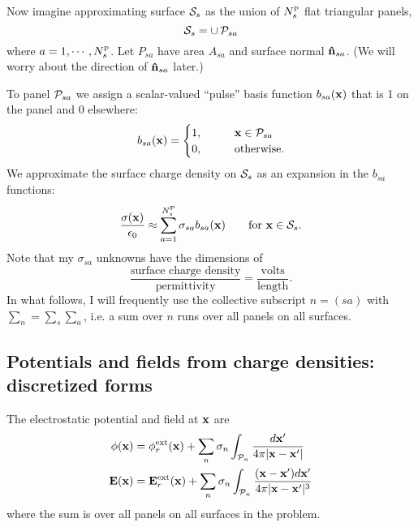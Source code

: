 \documentclass[letterpaper]{article}
\begin{document}
Now imagine approximating surface $\mathcal{S}_s$ as the union
of $N_s^{\hbox{\tiny{P}}}$ flat triangular panels, 
$$ \mathcal{S}_{s} = \cup \, \mathcal{P}_{sa}$$
where $a=1,\cdots,N_s^{\hbox{\tiny{P}}}$.
Let $P_{sa}$ have area $A_{sa}$ and surface normal
$\mathbf{\hat n}_{sa}$. (We will worry about the direction
of $\mathbf{\hat n}_{sa}$ later.)

To panel $\mathcal{P}_{sa}$ we assign a scalar-valued 
``pulse'' basis function $b_{sa}(\mathbf{x})$ that is 
1 on the panel and 0 elsewhere:
$$ b_{sa}(\mathbf{x}) = 
   \begin{cases}
    1, \qquad &\mathbf{x} \in \mathcal{P}_{sa} \\
    0, \qquad &\text{otherwise}.
  \end{cases}
$$
We approximate the surface charge density on $\mathcal{S}_s$
as an expansion in the $b_{sa}$ functions:
$$ \frac{\sigma(\mathbf{x})}{\epsilon_0} 
   \approx \sum_{a=1}^{N_s^{\hbox{\tiny{P}}}} \sigma_{sa} b_{sa}(\mathbf{x})
   \qquad 
   \text{for }\mathbf{x}\in \mathcal{S}_s.
$$
Note that my $\sigma_{sa}$ unknowns have the dimensions
of 
$$\frac{\text{surface charge density}}{\text{permittivity}}=
  \frac{\text{volts}}{\text{length}}.
$$
In what follows, I will frequently use the collective
subscript $n=(sa)$ with $\sum_n=\sum_s \sum_a$, i.e.
a sum over $n$ runs over all panels on all surfaces.

\subsection*{Potentials and fields from charge densities: 
             discretized forms} 

The electrostatic potential and field at $\mathbf{x}$ are 
\begin{subequations}
\begin{align}
\phi(\mathbf{x}) 
&= \phi_r^{\hbox{\scriptsize{ext}}}(\mathbf{x})
   +
   \sum_{n} \sigma_n 
   \int_{\mathcal{P}_n} \frac{d\mathbf{x}^\prime}{4\pi |\mathbf{x} - \mathbf{x}^\prime|}
\\
\mathbf{E}(\mathbf{x}) 
&= \mathbf{E}_r^{\hbox{\scriptsize{ext}}}(\mathbf{x})
   +
   \sum_{n} \sigma_n 
   \int_{\mathcal{P}_n} \frac{(\mathbf{x}-\mathbf{x}^\prime)d\mathbf{x}^\prime}
                       {4\pi |\mathbf{x} - \mathbf{x}^\prime|^3}
\end{align}
\label{DiscreteEquations1}
\end{subequations}
where the sum is over all panels on all surfaces in the problem.
\end{document}
